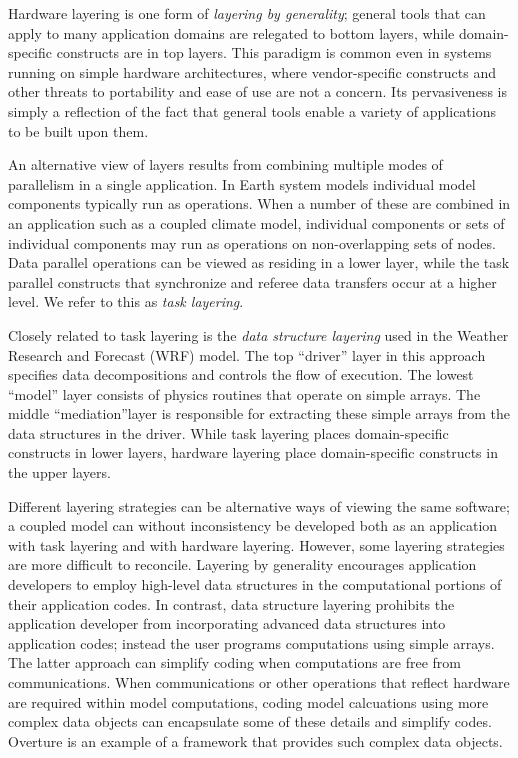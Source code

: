 Hardware layering is one form of {\it layering by generality}; general 
tools that can apply to many application domains are relegated to bottom layers, 
while domain-specific constructs are in top layers.  This paradigm is
common even in systems running on simple hardware architectures, where 
vendor-specific
constructs and other threats to portability and ease of use are not a concern.
Its pervasiveness is simply a reflection of the fact that general tools 
enable a variety of applications to be built upon them.

An alternative view of layers results from combining multiple modes of parallelism 
in a single application.  In Earth system models individual model 
components typically run as  
operations.  When a number of 
these are combined in an application such as a coupled climate model, individual 
components or sets of individual components may run as  operations 
on non-overlapping sets of nodes.  Data parallel operations can be viewed
as residing in a lower layer, while the task parallel constructs that 
synchronize and referee data transfers occur at a higher level. We refer to 
this as {\it task layering}.

Closely related to task layering is the {\it data structure layering} used 
in the Weather Research and Forecast (WRF) model.  The top ``driver'' layer 
in this approach specifies data decompositions and controls
the flow of execution.  The lowest ``model'' layer consists of physics routines that
operate on simple arrays.  The middle ``mediation''layer is responsible for 
extracting these simple arrays from the data structures in the driver.
While task layering places domain-specific constructs in lower layers, hardware 
layering place domain-specific constructs in the upper layers.  

Different layering strategies can be alternative ways of viewing the same
software; a coupled model can without inconsistency 
be developed both as an application with task layering and with hardware 
layering.  However, some layering strategies are more difficult to reconcile. 
Layering by generality encourages application developers to employ high-level 
data structures in the computational portions of their application codes.  In 
contrast, data structure layering prohibits the application developer from 
incorporating advanced data structures into application codes; instead the
user programs computations using simple arrays.  The latter approach can 
simplify coding
when computations are free from communications.  When communications or other
operations that reflect hardware are required within model computations, coding
model calcuations using more complex data objects can encapsulate some of 
these details and simplify codes.  Overture is an example of a framework 
that provides such complex data objects.

